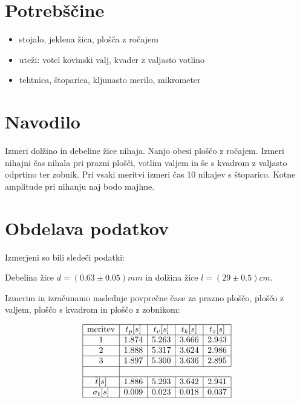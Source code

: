 \documentclass[12pt]{report}
\begin{document}
\begingroup
\let\clearpage\relax

\chapter*{Potrebščine}
\begin{itemize}
\item stojalo, jeklena žica, plošča z ročajem
\item uteži: votel kovinski valj, kvader z valjasto votlino
\item tehtnica, štoparica, kljunasto merilo, mikrometer
\end{itemize}

\chapter*{Navodilo}
Izmeri dolžino in debeline žice nihaja. Nanjo obesi ploščo z ročajem. Izmeri nihajni čas nihala pri prazni plošči, votlim valjem in še s kvadrom z valjasto odprtino ter zobnik. Pri vsaki meritvi izmeri čas 10 nihajev s štoparico. Kotne amplitude pri nihanju naj bodo majhne. 
\endgroup


\chapter*{Obdelava podatkov}

Izmerjeni so bili sledeči podatki: 

Debelina žice $d = (0.63 \pm 0.05)mm$ in dolžina žice $l = (29 \pm 0.5)cm$. 

Izmerim in izračunamo naslednje povprečne čase za prazno ploščo, ploščo z valjem, ploščo s kvadrom in ploščo z zobnikom: 

\begin{tabela}[H]
  \centering
  \[
  \begin{array}{|c|c|c|c|c|}\hline
    \text{meritev} & t_p[s] & t_v[s] & t_k[s] & t_z[s] \\ \hline
    1 & 1.874 & 5.263 & 3.666 & 2.943 \\ \hline
    2 & 1.888 & 5.317 & 3.624 & 2.986 \\ \hline
    3 & 1.897 & 5.300 & 3.636 & 2.895 \\ \hline
    \\ \hline
    \overline{t}[s] & 1.886 & 5.293 & 3.642 & 2.941 \\\hline
    \sigma_t[s] & 0.009 & 0.023 & 0.018 & 0.037 \\ \hline
  \end{array}
  \]
\end{tabela}
\end{document}
